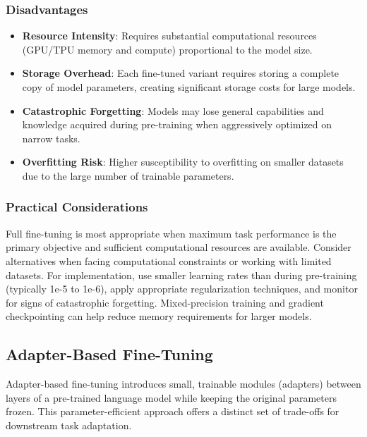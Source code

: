 \subsubsection{Disadvantages}
\begin{itemize}
    \item \textbf{Resource Intensity}: Requires substantial computational resources (GPU/TPU memory and compute) proportional to the model size.
    \item \textbf{Storage Overhead}: Each fine-tuned variant requires storing a complete copy of model parameters, creating significant storage costs for large models.
    \item \textbf{Catastrophic Forgetting}: Models may lose general capabilities and knowledge acquired during pre-training when aggressively optimized on narrow tasks.
    \item \textbf{Overfitting Risk}: Higher susceptibility to overfitting on smaller datasets due to the large number of trainable parameters.
\end{itemize}

\subsubsection{Practical Considerations}
Full fine-tuning is most appropriate when maximum task performance is the primary objective and sufficient computational resources are available. Consider alternatives when facing computational constraints or working with limited datasets. For implementation, use smaller learning rates than during pre-training (typically 1e-5 to 1e-6), apply appropriate regularization techniques, and monitor for signs of catastrophic forgetting. Mixed-precision training and gradient checkpointing can help reduce memory requirements for larger models.

\subsection{Adapter-Based Fine-Tuning}

Adapter-based fine-tuning introduces small, trainable modules (adapters) between layers of a pre-trained language model while keeping the original parameters frozen. This parameter-efficient approach offers a distinct set of trade-offs for downstream task adaptation.

